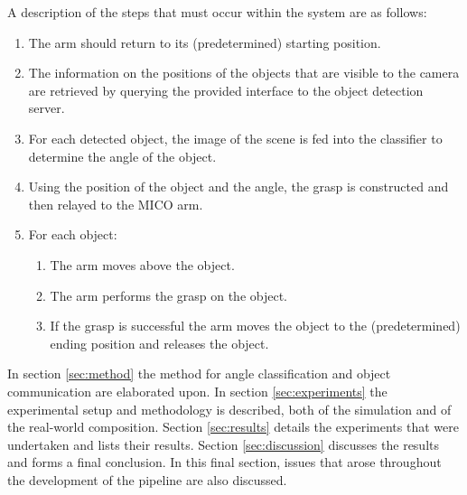 \documentclass[letterpaper, 10 pt, conference]{conf/ieeeconf}  %
\begin{document}
A description of the steps that must occur within the system are as follows:
\begin{enumerate}
\item The arm should return to its (predetermined) starting position.
\item The information on the positions of the objects that are visible to the
  camera are retrieved by querying the provided interface to the object detection
  server.
\item For each detected object, the image of the scene is fed into the
  classifier to determine the angle of the object.
\item Using the position of the object and the angle, the grasp is constructed
  and then relayed to the MICO arm.
\item For each object:
  \begin{enumerate}
  \item The arm moves above the object.
  \item The arm performs the grasp on the object.
  \item If the grasp is successful the arm moves the object to the
    (predetermined) ending position and releases the object.
  \end{enumerate}
\end{enumerate}

In section \ref{sec:method} the method for angle classification and object
communication are elaborated upon. In section \ref{sec:experiments} the
experimental setup and methodology is described, both of the simulation and of
the real-world composition. Section \ref{sec:results} details the experiments
that were undertaken and lists their results. Section \ref{sec:discussion}
discusses the results and forms a final conclusion. In this final section,
issues that arose throughout the development of the pipeline are also discussed.




\end{document}

